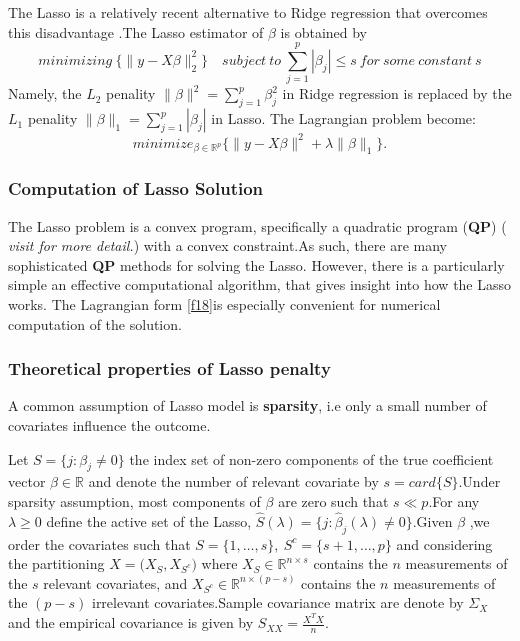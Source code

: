 \documentclass[12pt]{report}
\begin{document}
The Lasso is a relatively recent alternative to Ridge regression that overcomes this disadvantage .The Lasso estimator of $\beta$ is obtained by 
\begin{equation}
	minimizing\  \bigg \{\parallel y- X\beta \parallel^{2}_{2}\bigg\}\quad subject\ to\ \sum_{j=1}^{p}|\beta_{j}|\leq s\ for\ some\ constant\ s
	\label{u2}
\end{equation}
Namely, the $L_{2}$ penality $\parallel \beta \parallel^{2}=\sum_{j=1}^{p}\beta_{j}^{2}$ in Ridge regression is replaced by the $L_{1}$ penality $\parallel \beta \parallel_{1}=\sum_{j=1}^{p}|\beta_{j}|$ in Lasso. The Lagrangian problem become:
\begin{equation}
	minimize_{\beta \in \mathbb{R}^{p} } \{ \parallel y- X\beta \parallel^{2}+ \lambda \parallel \beta \parallel_{1}\}.
	\label{f18}
\end{equation}
	\subsubsection{Computation of Lasso Solution}
The Lasso problem is a convex program, specifically a quadratic program (\textbf{QP}) ( \textsl{visit \cite{ref2} for more detail.}) with a convex constraint.As such, there are many sophisticated \textbf{QP} methods for solving the Lasso. However, there is a particularly simple an effective computational algorithm, that gives insight into how the Lasso works. The Lagrangian form \eqref{f18}is especially convenient for numerical computation of the solution.
	\subsubsection{Theoretical properties of Lasso penalty}
\label{tpl}
A common assumption of Lasso model is \textbf{sparsity}, i.e only a small number of covariates influence the outcome.

Let $S=\big\{j:\beta_{j}\neq 0\big \}$ the index set of non-zero components of the true coefficient vector $\beta \in \mathbb{R}$ and denote the number of relevant covariate by $s=card\{S\}$.Under sparsity assumption, most components of $\beta$ are zero such that $s\ll p$.For any $\lambda\geqslant 0$ define the active set of the Lasso, $\hat{S}(\lambda)=\big\{j:\hat{\beta}_{j}(\lambda)\neq 0\}$.Given $\beta$ ,we order the covariates such that $S=\big\{1,\dots,s\},\ S^{c} =\big\{s+1,\dots,p\big \}$ and considering the partitioning $X=\big(X_{S},X_{S^{c}}\big)$ where $X_{S}\in \mathbb{R}^{n\times s}$ contains the $n$ measurements of the $s$ relevant covariates, and  $X_{S^{c}}\in \mathbb{R}^{n\times(p-s) }$ contains the $n$  measurements of the $(p-s)$ irrelevant covariates.Sample covariance matrix are denote by $\Sigma_{X}$ and the empirical covariance is given by $S_{XX}=\frac{X^{T}X}{n}$.
\end{document}
